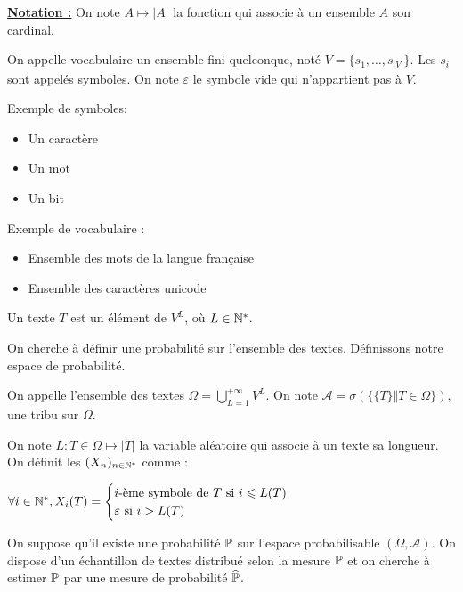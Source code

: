 \underline{\textbf{Notation :}} On note $A \mapsto \vert A \vert$ la fonction qui associe à un ensemble $A$ son cardinal.

\begin{definition}
  On appelle vocabulaire un ensemble fini quelconque, noté $V = \{ s_1, \ldots, s_{\vert V \vert} \}$. Les $s_i$ sont appelés symboles.
  On note $\varepsilon$ le symbole vide qui n'appartient pas à $V$.
\end{definition}

Exemple de symboles:
\begin{itemize}
\item Un caractère
\item Un mot
\item Un bit
\end{itemize}

Exemple de vocabulaire :
  \begin{itemize}
      \item Ensemble des mots de la langue française
      \item Ensemble des caractères unicode
  \end{itemize}

\begin{definition}
Un texte $T$ est un élément de $V^L$, où $L \in \N^*$.
\end{definition}

On cherche à définir une probabilité sur l'ensemble des textes. Définissons notre espace de probabilité.

\begin{definition}
On appelle l'ensemble des textes $\Omega = \bigcup_{L=1}^{+\infty} V^L$.
On note $\mathcal{A} = \sigma\left(\{\{T\} \Vert T \in \Omega \} \right)$, une tribu sur $\Omega$.
\end{definition}

On note $L : T \in \Omega \mapsto \vert T \vert$ la variable aléatoire qui associe à un texte sa longueur.
On définit les $(X_n)_{n \in \N^*}$ comme :

$\forall i \in \N^*, X_i(T) = \begin{cases}
  i\text{-ème symbole de } T \text{ si } i \leq L(T) \\
  \varepsilon \text{ si } i > L(T) 
\end{cases}$

\vspace{0.4cm}

On suppose qu'il existe une probabilité $\P$ sur l'espace probabilisable $(\Omega, \mathcal{A})$.
On dispose d'un échantillon de textes distribué selon la mesure $\P$ et on cherche à estimer $\P$ par une mesure de probabilité $\widehat{\P}$.

